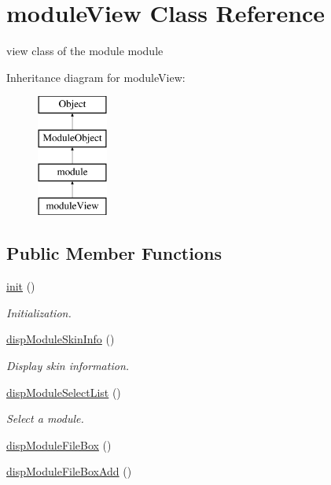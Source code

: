 \hypertarget{classmoduleView}{}\section{module\+View Class Reference}
\label{classmoduleView}


view class of the module module  


Inheritance diagram for module\+View\+:\begin{figure}[H]
\begin{center}
\leavevmode
\includegraphics[height=4.000000cm]{classmoduleView}
\end{center}
\end{figure}
\subsection*{Public Member Functions}
\begin{DoxyCompactItemize}
\item 
\hyperlink{classmoduleView_a1d511f9c31e82b1d66703287c3834dc0}{init} ()
\begin{DoxyCompactList}\small\item\em Initialization. \end{DoxyCompactList}\item 
\hyperlink{classmoduleView_abe0e2fe2a54a48a08c0a208b075b5586}{disp\+Module\+Skin\+Info} ()
\begin{DoxyCompactList}\small\item\em Display skin information. \end{DoxyCompactList}\item 
\hyperlink{classmoduleView_a801c0978511c936589b76fb609a2778a}{disp\+Module\+Select\+List} ()
\begin{DoxyCompactList}\small\item\em Select a module. \end{DoxyCompactList}\item 
\hyperlink{classmoduleView_a88b4412f774d5b2d54adfad1779a0cc5}{disp\+Module\+File\+Box} ()
\item 
\hyperlink{classmoduleView_acb1f66a7abc38852dd38b3d133e7f3cc}{disp\+Module\+File\+Box\+Add} ()
\end{DoxyCompactItemize}

